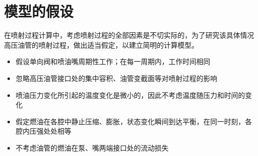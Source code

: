 \documentclass[withoutpreface,bwprint]{cumcmthesis} %
\begin{document}
	\section{模型的假设}
	在喷射过程计算中，考虑喷射过程的全部因素是不切实际的，为了研究该具体情况高压油管的喷射过程，做出适当假定，以建立简明的计算模型。
	\begin{itemize}
		\item 假设单向阀和喷油嘴周期性工作；在每一周期内，工作时间相同
		\item 忽略高压油管接口处的集中容积、油管变截面等对喷射过程的影响
		\item 喷油压力变化所引起的温度变化是微小的\cite{bib:one}，因此不考虑温度随压力和时间的变化
		\item 假定燃油在各腔中静止压缩、膨胀，状态变化瞬间到达平衡，在同一时刻，各腔内压强处处相等
		\item 不考虑油管的燃油在泵、嘴两端接口处的流动损失
		
	\end{itemize}
	
\end{document}
